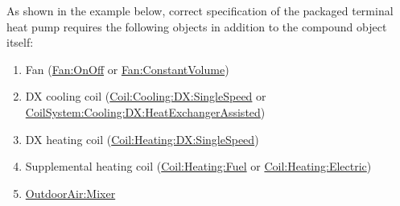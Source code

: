 As shown in the example below, correct specification of the packaged terminal heat pump requires the following objects in addition to the compound object itself:

\begin{enumerate}
\def\labelenumi{\arabic{enumi})}
\item
  Fan (\hyperref[fanonoff]{Fan:OnOff} or \hyperref[fanconstantvolume]{Fan:ConstantVolume})
\item
  DX cooling coil (\hyperref[coilcoolingdxsinglespeed]{Coil:Cooling:DX:SingleSpeed} or \hyperref[coilsystemcoolingdxheatexchangerassisted]{CoilSystem:Cooling:DX:HeatExchangerAssisted})
\item
  DX heating coil (\hyperref[coilheatingdxsinglespeed]{Coil:Heating:DX:SingleSpeed})
\item
  Supplemental heating coil (\hyperref[coilheatinggas-000]{Coil:Heating:Fuel} or \hyperref[coilheatingelectric]{Coil:Heating:Electric})
\item
  \hyperref[outdoorairmixer]{OutdoorAir:Mixer}
\end{enumerate}

